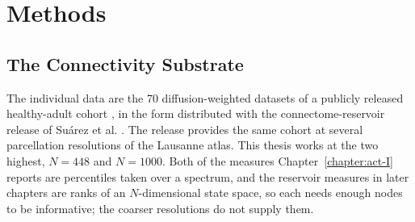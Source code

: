 \chapter{Methods}
\label{chapter:methods}










\section{The Connectivity Substrate}
\label{sec:methods-substrate}
\bigskip

The individual data are the 70 %
diffusion-weighted datasets of a publicly released healthy-adult
cohort \cite{griffa2019structural}, in the form distributed with the
connectome-reservoir release of Suárez et al. \cite{suarez2021learning}. The
release provides the same cohort at several parcellation resolutions of the
Lausanne atlas. This thesis works at the two highest,
$N = 448$ and $N = 1000$. %
Both of the measures Chapter~\ref{chapter:act-I} reports are percentiles taken
over a spectrum, and the reservoir measures in later chapters are ranks of an
$N$-dimensional state space, so each needs enough nodes to be informative; the
coarser resolutions do not supply them.

